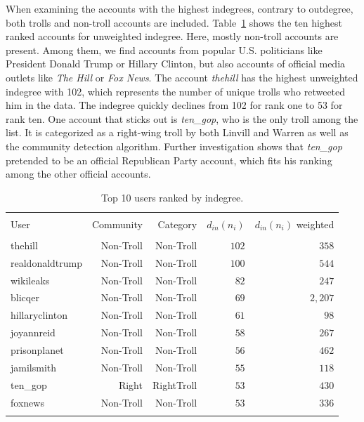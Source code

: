 \documentclass[12pt, titlepage=true, toc=bib]{scrartcl}
\begin{document}
When examining the accounts with the highest indegrees, contrary to outdegree, both trolls and non-troll accounts are included. Table~\ref{tab:in} shows the ten highest ranked accounts for unweighted indegree. Here, mostly non-troll accounts are present. Among them, we find  accounts from popular U.S. politicians like President Donald Trump or Hillary Clinton, but also accounts of official media outlets like \textit{The Hill} or \textit{Fox News}. The account \textit{thehill} has the highest unweighted indegree with 102, which represents the number of unique trolls who retweeted him in the data. The indegree quickly declines from 102 for rank one to 53 for rank ten. One account that sticks out is \textit{ten\_gop}, who is the only troll among the list. It is categorized as a right-wing troll by both Linvill and Warren \cite*{linvill_troll_2018} as well as the community detection algorithm. Further investigation shows that \textit{ten\_gop} pretended to be an official Republican Party account, which fits his ranking among the other official accounts. %

\begin{table}[!ht] \centering 
  \begin{tabular*}{.95\linewidth}{@{\extracolsep{\fill}} lrrrr} 
\\[-1.8ex]\hline 
\hline \\[-1.8ex] 
User & Community & Category & \( d_{in}(n_{i}) \) & \( d_{in}(n_{i}) \) weighted \\ 
\hline \\[-1.8ex] 
thehill & Non-Troll & Non-Troll & $102$ & $358$ \\ 
realdonaldtrump & Non-Troll & Non-Troll & $100$ & $544$ \\ 
wikileaks & Non-Troll & Non-Troll & $82$ & $247$ \\ 
blicqer & Non-Troll & Non-Troll & $69$ & $2,207$ \\ 
hillaryclinton & Non-Troll & Non-Troll & $61$ & $98$ \\ 
joyannreid & Non-Troll & Non-Troll & $58$ & $267$ \\ 
prisonplanet & Non-Troll & Non-Troll & $56$ & $462$ \\ 
jamilsmith & Non-Troll & Non-Troll & $55$ & $118$ \\ 
ten\_gop & Right & RightTroll & $53$ & $430$ \\ 
foxnews & Non-Troll & Non-Troll & $53$ & $336$ \\ 
\hline \\[-1.8ex] 
\end{tabular*} 
\caption[Indegree]{Top 10 users ranked by indegree.} 
  \label{tab:in} 
\end{table} 
\end{document}
